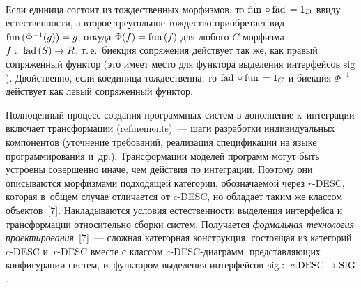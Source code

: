 \begin{multicols}{2}
\vspace*{-6pt}
 \begin{center}
 \mbox{%
 \epsfxsize=51.035mm
 }
 \end{center}


 Если единица состоит из тождественных морфизмов, то $\mathrm{fun}\, \circ \mathrm{fad}\, \hm=
1_D$ ввиду естественности, а второе треугольное тождество приобретает вид
$\mathrm{fun}\,(\Phi^{-1}(g)) \hm= g$, откуда $\Phi (f)\hm = \mathrm{fun}\,(f)$ для любого
 $C$-мор\-физ\-ма $f:\ \mathrm{fad}\,(S) \hm\to R$, т.\,е.\ биекция сопряжения действует
так же, как правый сопряженный функтор (это имеет место для функтора
выделения интерфейсов $\mathrm{sig}$). Двойственно, если коединица тождественна, то
$\mathrm{fad}\, \circ \mathrm{fun}\, \hm= 1_C$ и биекция $\Phi^{-1}$ действует как левый
сопряженный функтор.

 Полноценный процесс создания программных систем в дополнение
 к~интеграции включает трансформации (refinements)~--- шаги разработки
индивидуальных компонентов (уточнение требований, реализа\-ция
спецификации на языке программирования и~др.). Трансформации моделей
программ могут быть устроены совершенно иначе, чем действия по
интеграции. Поэтому они описываются морфизмами подходящей категории,
обозначаемой через $r$-DESC, которая в~общем случае отличается от
 $c$-DESC, но обладает таким же классом объектов~[7]. Накладываются
условия естественности выделения интерфейса и трансформации относительно
сборки систем. Получается \textit{формальная технология
проектирования}~[7]~--- сложная категорная конструкция, состоящая из
категорий \mbox{$c$-DESC} и~\mbox{$r$-DESC} вместе с классом $c$-DESC-диа\-грамм,
представляющих конфигурации систем, и~функтором выделения интерфейсов
$\mathrm{sig}:\ c\mbox{-}\mathrm{DESC} \hm\to \mathrm{SIG}$.


\end{multicols}
